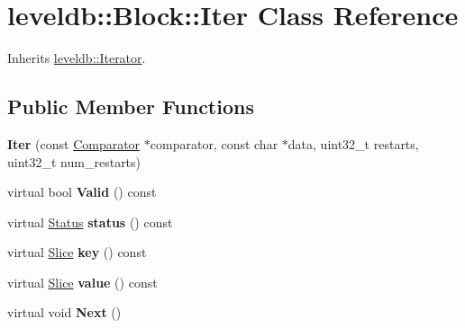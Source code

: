 \hypertarget{classleveldb_1_1_block_1_1_iter}{}\section{leveldb\+::Block\+::Iter Class Reference}
\label{classleveldb_1_1_block_1_1_iter}


Inherits \mbox{\hyperlink{classleveldb_1_1_iterator}{leveldb\+::\+Iterator}}.

\subsection*{Public Member Functions}
\begin{DoxyCompactItemize}
\item 
\mbox{\label{classleveldb_1_1_block_1_1_iter_a31b124ec1fc5750b31b182dc44282588}} 
{\bfseries Iter} (const \mbox{\hyperlink{structleveldb_1_1_comparator}{Comparator}} $\ast$comparator, const char $\ast$data, uint32\+\_\+t restarts, uint32\+\_\+t num\+\_\+restarts)
\item 
\mbox{\label{classleveldb_1_1_block_1_1_iter_a8fa2be549a032cd010ee722ffd4af28f}} 
virtual bool {\bfseries Valid} () const
\item 
\mbox{\label{classleveldb_1_1_block_1_1_iter_a767cbcc1a9baa95b8eed089a5997897c}} 
virtual \mbox{\hyperlink{classleveldb_1_1_status}{Status}} {\bfseries status} () const
\item 
\mbox{\label{classleveldb_1_1_block_1_1_iter_ab762e46fcf9e06ef85c876ed4c92b1e3}} 
virtual \mbox{\hyperlink{classleveldb_1_1_slice}{Slice}} {\bfseries key} () const
\item 
\mbox{\label{classleveldb_1_1_block_1_1_iter_a1cf66d3bb0fb70a706c95aaba9f03011}} 
virtual \mbox{\hyperlink{classleveldb_1_1_slice}{Slice}} {\bfseries value} () const
\item 
\mbox{\label{classleveldb_1_1_block_1_1_iter_a27dacbefa903333a5ad003ccd3e424b6}} 
virtual void {\bfseries Next} ()
\item 
\mbox{\label{classleveldb_1_1_block_1_1_iter_a096747ff77d5090579fe4cd4e464a3c9}} 

\end{DoxyCompactItemize}
